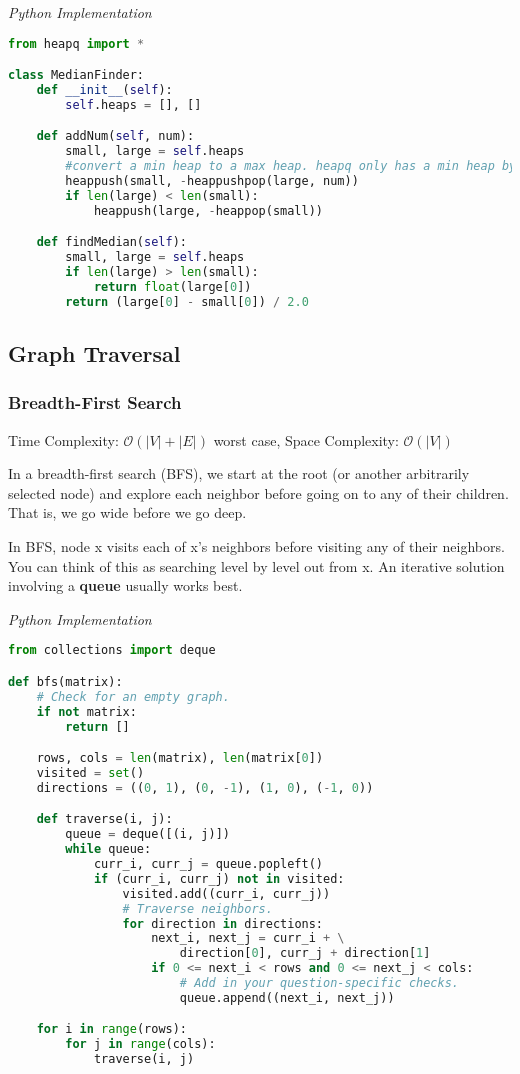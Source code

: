 \documentclass{article}
\newcommand{\bigO}{\ensuremath{\mathcal{O}}}
\begin{document}
\vspace{8pt} \emph{Python Implementation}
\begin{lstlisting}[language=Python]
from heapq import *

class MedianFinder:
    def __init__(self):
        self.heaps = [], []

    def addNum(self, num):
        small, large = self.heaps
        #convert a min heap to a max heap. heapq only has a min heap by default.
        heappush(small, -heappushpop(large, num))
        if len(large) < len(small):
            heappush(large, -heappop(small))

    def findMedian(self):
        small, large = self.heaps
        if len(large) > len(small):
            return float(large[0])
        return (large[0] - small[0]) / 2.0
\end{lstlisting}

    \subsection{Graph Traversal}
    
    \subsubsection{Breadth-First Search}
    Time Complexity: $\bigO(|V| + |E|)$ worst case, Space Complexity: $\bigO(|V|)$
    
    In a breadth-first search (BFS), we start at the root (or another arbitrarily selected node) and explore each neighbor before going on to any of their children. That is, we go wide before we go deep. 
    
    In BFS, node x visits each of x's neighbors before visiting any of their neighbors. You can think of this as searching level by level out from x. An iterative solution involving a \textbf{queue} usually works best. 
    
\vspace{8pt} \emph{Python Implementation}
\begin{lstlisting}[language=Python]
from collections import deque

def bfs(matrix):
    # Check for an empty graph.
    if not matrix:
        return []

    rows, cols = len(matrix), len(matrix[0])
    visited = set()
    directions = ((0, 1), (0, -1), (1, 0), (-1, 0))

    def traverse(i, j):
        queue = deque([(i, j)])
        while queue:
            curr_i, curr_j = queue.popleft()
            if (curr_i, curr_j) not in visited:
                visited.add((curr_i, curr_j))
                # Traverse neighbors.
                for direction in directions:
                    next_i, next_j = curr_i + \
                        direction[0], curr_j + direction[1]
                    if 0 <= next_i < rows and 0 <= next_j < cols:
                        # Add in your question-specific checks.
                        queue.append((next_i, next_j))

    for i in range(rows):
        for j in range(cols):
            traverse(i, j)
\end{lstlisting}
\end{document}
